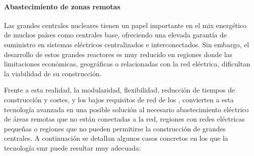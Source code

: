 \paragraph{Abastecimiento de zonas remotas} \label{zonas_remotas}

Las grandes centrales nucleares tienen un papel importante en el mix energético de muchos países como centrales base, ofreciendo una elevada garantía de suministro en sistemas eléctricos centralizados e interconectados. Sin embargo, el desarrollo de estos grandes reactores es muy reducido en regiones donde las limitaciones económicas, geográficas o relacionadas con la red eléctrica, dificultan la viabilidad de su construcción. 

Frente a esta realidad, la modularidad, flexibilidad, reducción de tiempos de construcción y costes, y los bajos requisitos de red de los , convierten a esta tecnología avanzada en una posible solución al necesario abastecimiento eléctrico de áreas remotas que no están conectadas a la red, regiones con redes eléctricas pequeñas o regiones que no pueden permitirse la construcción de grandes centrales. A continuación se detallan algunos casos concretos en los que la tecnología \acrshort{smr} puede resultar muy adecuada:

